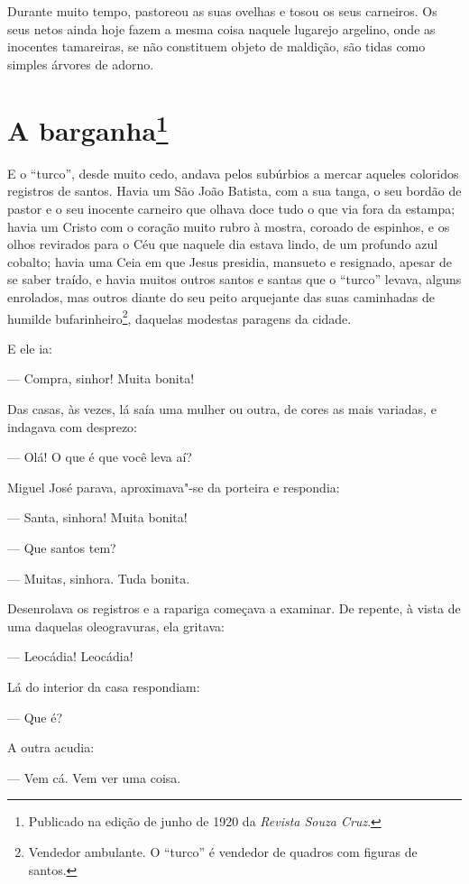 Durante muito tempo, pastoreou as suas ovelhas e tosou os seus
carneiros. Os seus netos ainda hoje fazem a mesma coisa naquele lugarejo
argelino, onde as inocentes tamareiras, se não constituem objeto de
maldição, são tidas como simples árvores de adorno.



\chapter[A barganha]{A barganha\footnote[*]{Publicado na edição de junho de 1920 da \emph{Revista Souza Cruz}.}}

E o ``turco'', desde muito cedo, andava pelos subúrbios a mercar aqueles
coloridos registros de santos. Havia um São João Batista, com a sua
tanga, o seu bordão de pastor e o seu inocente carneiro que olhava doce
tudo o que via fora da estampa; havia um Cristo com o coração muito
rubro à mostra, coroado de espinhos, e os olhos revirados para o Céu que
naquele dia estava lindo, de um profundo azul cobalto; havia uma Ceia em
que Jesus presidia, mansueto e resignado, apesar de se saber traído, e
havia muitos outros santos e santas que o ``turco'' levava, alguns
enrolados, mas outros diante do seu peito arquejante das suas caminhadas
de humilde bufarinheiro\footnote{Vendedor ambulante. O ``turco'' é
  vendedor de quadros com figuras de santos.}, daquelas modestas
paragens da cidade.

E ele ia:

--- Compra, sinhor! Muita bonita!

Das casas, às vezes, lá saía uma mulher ou outra, de cores as mais
variadas, e indagava com desprezo:

--- Olá! O que é que você leva aí?

Miguel José parava, aproximava"-se da porteira e respondia:

--- Santa, sinhora! Muita bonita!

--- Que santos tem?

--- Muitas, sinhora. Tuda bonita.

Desenrolava os registros e a rapariga começava a examinar. De repente, à
vista de uma daquelas oleogravuras, ela gritava:

--- Leocádia! Leocádia!

Lá do interior da casa respondiam:

--- Que é?

A outra acudia:

--- Vem cá. Vem ver uma coisa.

